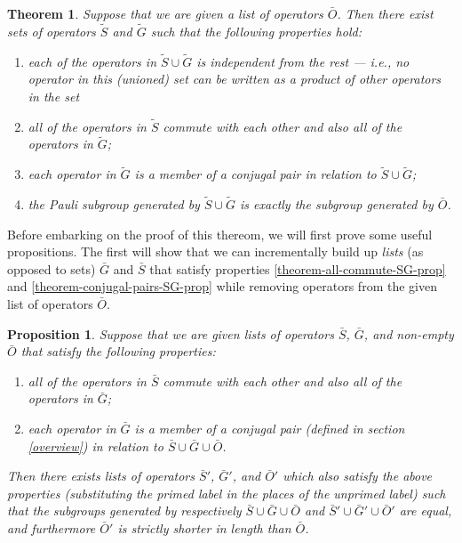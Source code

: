 \documentclass[twocolumn,showpacs,preprintnumbers,amsmath,amssymb,nofootinbib,pra,floatfix]{revtex4}
\newtheorem{theorem}{Theorem}
\newtheorem{proposition}{Proposition}
\newenvironment{remark}[1][Remark]{\begin{trivlist}
\item[\hskip \labelsep {\bfseries #1}]}{\end{trivlist}}
\begin{document}
\begin{theorem} \label{theorem-SG} Suppose that we are given a list of operators $\bar O$.  Then there exist sets of operators $\tilde S$ and $\tilde G$ such that the following properties hold:
\begin{enumerate}
\item each of the operators in $\tilde S \cup \tilde G$ is
  independent from the rest --- i.e., no operator in this (unioned) set can
  be written as a product of other operators in the set
\item \label{theorem-all-commute-SG-prop} all of the operators in $\tilde S$ commute with each other and
  also all of the operators in $\tilde G$;
\item \label{theorem-conjugal-pairs-SG-prop} each operator in $\tilde G$ is a member of a conjugal pair in relation to $\tilde S \cup \tilde G$;
\item \label{theorem-complete-SG-prop} the Pauli subgroup generated by $\tilde S \cup \tilde G$ is exactly
  the subgroup generated by $\bar O$.
\end{enumerate}
\end{theorem}
\begin{remark}
Before embarking on the proof of this thereom, we will first prove some useful propositions.  The first will show that we can incrementally build up \emph{lists} (as opposed to sets) $\bar G$ and $\bar S$ that satisfy properties \ref{theorem-all-commute-SG-prop} and \ref{theorem-conjugal-pairs-SG-prop} while removing operators from the given list of operators $\bar O$.
\end{remark}

\begin{proposition} \label{proposition-SG} Suppose that we are given lists of operators $\bar S$, $\bar G$, and non-empty $\bar O$ that satisfy the following properties:
\begin{enumerate}
\item all of the operators in $\bar S$ commute with each other and also all of the operators in $\bar G$; \label{stabs-commute-with-G}
\item each operator in $\bar G$ is a member of a \emph{conjugal pair} (defined in section \ref{overview}) in relation to $\bar S \cup \bar G \cup \bar O$. \label{conjugal-pairs-commute-with-SAG}
\end{enumerate}
Then there exists lists of operators $\bar S'$, $\bar G'$, and $\bar O'$ which also satisfy the above properties (substituting the primed label in the places of the unprimed label) such that the subgroups generated by respectively $\bar S\cup \bar G\cup \bar O$ and $\bar S'\cup \bar G'\cup \bar O'$ are equal, and furthermore $\bar O'$ is strictly shorter in length than $\bar O$.
\end{proposition}
\end{document}
